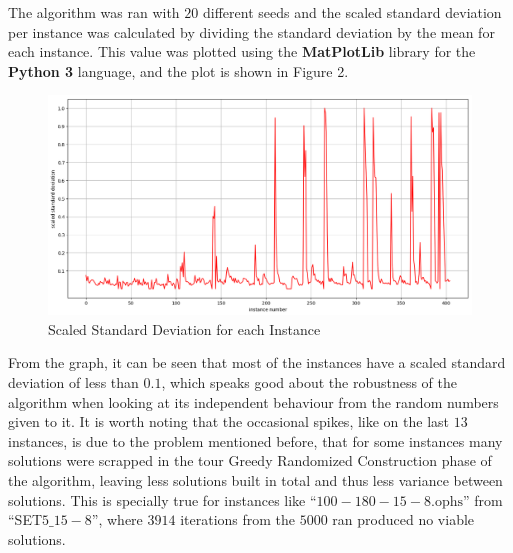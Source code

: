 The algorithm was ran with $20$ different seeds and the scaled standard deviation per instance was calculated by dividing the standard deviation by the mean for each instance. This value was plotted using the \textbf{MatPlotLib} library for the \textbf{Python 3} language, and the plot is shown in Figure 2.


\begin{figure}
    \centering
    \includegraphics[scale=0.35]{pictures/stddev_graph.png}
    \caption{Scaled Standard Deviation for each Instance}
    \label{fig:stddevperinstance}
\end{figure}

From the graph, it can be seen that most of the instances have a scaled standard deviation of less than $0.1$, which speaks good about the robustness of the algorithm when looking at its independent behaviour from the random numbers given to it. It is worth noting that the occasional spikes, like on the last $13$ instances, is due to the problem mentioned before, that for some instances many solutions were scrapped in the tour Greedy Randomized Construction phase of the algorithm, leaving less solutions built in total and thus less variance between solutions. This is specially true for instances like ``$100-180-15-8\text{.ophs}$'' from ``SET$5\_15-8$'', where $3914$ iterations from the $5000$ ran produced no viable solutions.
